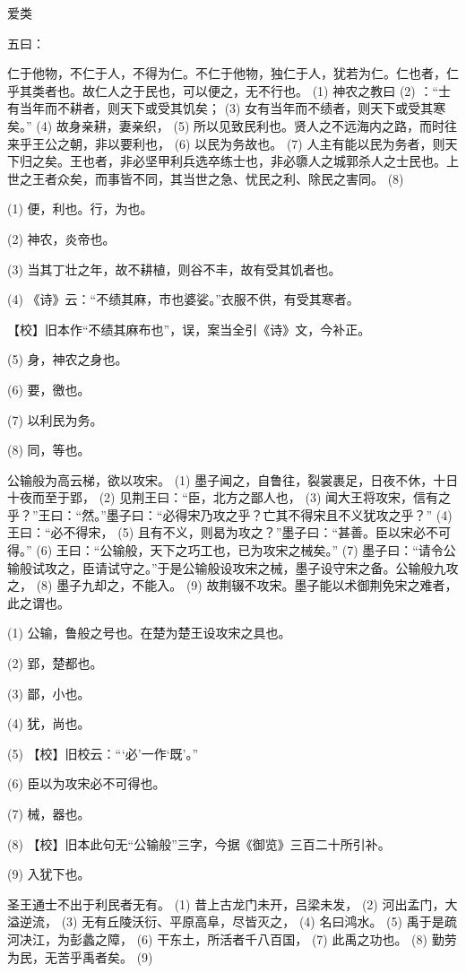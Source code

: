 \documentclass[12pt,UTF8]{ctexbook}
\begin{document}
爱类


五曰：

仁于他物，不仁于人，不得为仁。不仁于他物，独仁于人，犹若为仁。仁也者，仁乎其类者也。故仁人之于民也，可以便之，无不行也。 (1) 神农之教曰 (2) ：“士有当年而不耕者，则天下或受其饥矣； (3) 女有当年而不绩者，则天下或受其寒矣。” (4) 故身亲耕，妻亲织， (5) 所以见致民利也。贤人之不远海内之路，而时往来乎王公之朝，非以要利也， (6) 以民为务故也。 (7) 人主有能以民为务者，则天下归之矣。王也者，非必坚甲利兵选卒练士也，非必隳人之城郭杀人之士民也。上世之王者众矣，而事皆不同，其当世之急、忧民之利、除民之害同。 (8)

(1) 便，利也。行，为也。

(2) 神农，炎帝也。

(3) 当其丁壮之年，故不耕植，则谷不丰，故有受其饥者也。

(4) 《诗》云：“不绩其麻，市也婆娑。”衣服不供，有受其寒者。

【校】旧本作“不绩其麻布也”，误，案当全引《诗》文，今补正。

(5) 身，神农之身也。

(6) 要，徼也。

(7) 以利民为务。

(8) 同，等也。

公输般为高云梯，欲以攻宋。 (1) 墨子闻之，自鲁往，裂裳裹足，日夜不休，十日十夜而至于郢， (2) 见荆王曰：“臣，北方之鄙人也， (3) 闻大王将攻宋，信有之乎？”王曰：“然。”墨子曰：“必得宋乃攻之乎？亡其不得宋且不义犹攻之乎？” (4) 王曰：“必不得宋， (5) 且有不义，则曷为攻之？”墨子曰：“甚善。臣以宋必不可得。” (6) 王曰：“公输般，天下之巧工也，已为攻宋之械矣。” (7) 墨子曰：“请令公输般试攻之，臣请试守之。”于是公输般设攻宋之械，墨子设守宋之备。公输般九攻之， (8) 墨子九却之，不能入。 (9) 故荆辍不攻宋。墨子能以术御荆免宋之难者，此之谓也。

(1) 公输，鲁般之号也。在楚为楚王设攻宋之具也。

(2) 郢，楚都也。

(3) 鄙，小也。

(4) 犹，尚也。

(5) 【校】旧校云：“‘必’一作‘既’。”

(6) 臣以为攻宋必不可得也。

(7) 械，器也。

(8) 【校】旧本此句无“公输般”三字，今据《御览》三百二十所引补。

(9) 入犹下也。

圣王通士不出于利民者无有。 (1) 昔上古龙门未开，吕梁未发， (2) 河出孟门，大溢逆流， (3) 无有丘陵沃衍、平原高阜，尽皆灭之， (4) 名曰鸿水。 (5) 禹于是疏河决江，为彭蠡之障， (6) 干东土，所活者千八百国， (7) 此禹之功也。 (8) 勤劳为民，无苦乎禹者矣。 (9)
\end{document}
